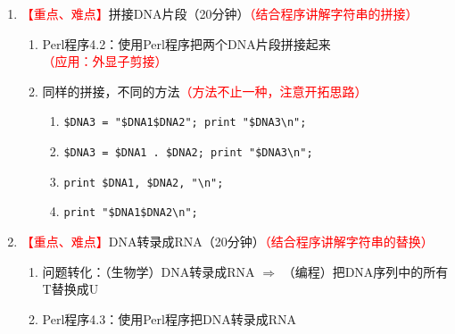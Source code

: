 \documentclass{TIJMUjiaoanLL}
\begin{document}
\begin{enumerate}
\begin{enumerate}
\begin{multicols}{2}
	\begin{itemize}
	  \item 编辑运行：ASCII或纯文本格式；可执行权限
	  \item 控制流：顺序执行；条件/循环流程控制\textcolor{red}{（和RPG中的主线支线相类比）}
	  \item 注释：以 \verb|#|起始，空行和注释会被解释器忽略
	  \item 命令解释：\verb|#!/usr/bin/perl|
	  \item 语句：以 \verb|;|结尾\textcolor{red}{（和中文/英文中的句号相类比）}
	  \item 变量：命名规范；标量变量（以 \verb|$|起始）
	  \item 字符串：单引号 vs. 双引号
	  \item 赋值：\verb|=| vs. \verb|==|
	  \item 打印输出：print，STDOUT
	  \item 退出：\verb|exit;| vs. 自动退出
	\end{itemize}
\end{multicols}
\vspace*{-1em}
    \end{enumerate}
  \item \textcolor{red}{【重点、难点】}拼接DNA片段（20分钟）\textcolor{red}{（结合程序讲解字符串的拼接）}
    \begin{enumerate}
      \item Perl程序4.2：使用Perl程序把两个DNA片段拼接起来\textcolor{red}{（应用：外显子剪接）}
      \item 同样的拼接，不同的方法\textcolor{red}{（方法不止一种，注意开拓思路）}
	\begin{enumerate}
	  \item \verb|$DNA3 = "$DNA1$DNA2"; print "$DNA3\n";|
	  \item \verb|$DNA3 = $DNA1 . $DNA2; print "$DNA3\n";|
	  \item \verb|print $DNA1, $DNA2, "\n";|
	  \item \verb|print "$DNA1$DNA2\n";|
	\end{enumerate}
    \end{enumerate}
  \item \textcolor{red}{【重点、难点】}DNA转录成RNA（20分钟）\textcolor{red}{（结合程序讲解字符串的替换）}
    \begin{enumerate}
      \item 问题转化：（生物学）DNA转录成RNA $\Longrightarrow$ （编程）把DNA序列中的所有T替换成U
      \item Perl程序4.3：使用Perl程序把DNA转录成RNA

\end{enumerate}
\end{enumerate}
\end{document}
